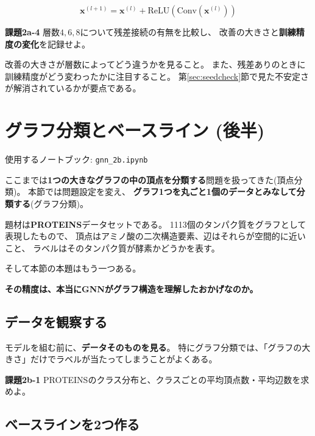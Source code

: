 \documentclass[11pt,a4paper]{jsarticle}
\begin{document}
\begin{equation}
\bm{x}^{(l+1)} = \bm{x}^{(l)} + \mathrm{ReLU}\!\left(\mathrm{Conv}(\bm{x}^{(l)})\right)
\end{equation}

\begin{screen}
\textbf{課題2a-4} \quad 層数$4,6,8$について残差接続の有無を比較し、
改善の大きさと\textbf{訓練精度の変化}を記録せよ。
\end{screen}

\noindent
改善の大きさが層数によってどう違うかを見ること。
また、残差ありのときに訓練精度がどう変わったかに注目すること。
第\ref{sec:seedcheck}節で見た不安定さが解消されているかが要点である。

\section{グラフ分類とベースライン (後半)}

使用するノートブック: \verb|gnn_2b.ipynb|

ここまでは\textbf{1つの大きなグラフの中の頂点を分類する}問題を扱ってきた(頂点分類)。
本節では問題設定を変え、
\textbf{グラフ1つを丸ごと1個のデータとみなして分類する}(グラフ分類)。

題材は\textbf{PROTEINS}データセットである。
1113個のタンパク質をグラフとして表現したもので、
頂点はアミノ酸の二次構造要素、辺はそれらが空間的に近いこと、
ラベルはそのタンパク質が酵素かどうかを表す。

そして本節の本題はもう一つある。

\begin{center}
\textbf{その精度は、本当にGNNがグラフ構造を理解したおかげなのか。}
\end{center}

\subsection{データを観察する}

モデルを組む前に、\textbf{データそのものを見る}。
特にグラフ分類では、「グラフの大きさ」だけでラベルが当たってしまうことがよくある。

\begin{screen}
\textbf{課題2b-1} \quad PROTEINSのクラス分布と、クラスごとの平均頂点数・平均辺数を求めよ。
\end{screen}

\subsection{ベースラインを2つ作る}
\end{document}
